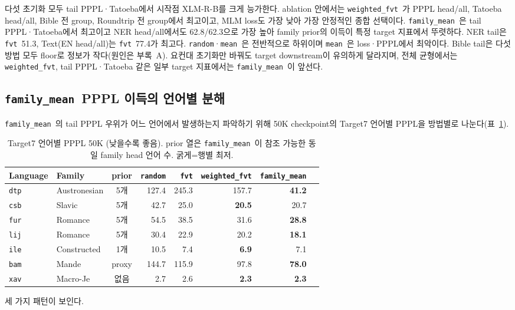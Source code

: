\documentclass[11pt,a4paper]{article}
\newcommand{\rand}{\texttt{random}}
\newcommand{\meanm}{\texttt{mean}}
\newcommand{\fvt}{\texttt{fvt}}
\newcommand{\wfvt}{\texttt{weighted\_fvt}}
\newcommand{\famm}{\texttt{family\_mean}}
\begin{document}
다섯 초기화 모두 tail PPPL·Tatoeba에서 시작점 XLM-R-B를 크게 능가한다. ablation 안에서는 \wfvt\ 가 PPPL head/all, Tatoeba head/all, Bible 전 group, Roundtrip 전 group에서 최고이고, MLM loss도 가장 낮아 가장 안정적인 종합 선택이다. \famm\ 은 tail PPPL·Tatoeba에서 최고이고 NER head/all에서도 62.8/62.3으로 가장 높아 family prior의 이득이 특정 target 지표에서 뚜렷하다. NER tail은 \fvt\ 51.3, Text(EN head/all)는 \fvt\ 77.4가 최고다. \rand·\meanm\ 은 전반적으로 하위이며 \meanm\ 은 loss·PPPL에서 최악이다. Bible tail은 다섯 방법 모두 floor로 정보가 작다(원인은 부록~A). 요컨대 초기화만 바꿔도 target downstream이 유의하게 달라지며, 전체 균형에서는 \wfvt, tail PPPL·Tatoeba 같은 일부 target 지표에서는 \famm\ 이 앞선다.

\subsection{\famm\ PPPL 이득의 언어별 분해}
\famm\ 의 tail PPPL 우위가 어느 언어에서 발생하는지 파악하기 위해 50K checkpoint의 Target7 언어별 PPPL을 방법별로 나눈다(표~\ref{tab:pppl_lang}).

\begin{table}[H]\centering\small
\caption{Target7 언어별 PPPL 50K (낮을수록 좋음). prior 열은 \famm\ 이 참조 가능한 동일 family head 언어 수. 굵게=행별 최저.}
\label{tab:pppl_lang}
\begin{tabular}{@{}llcrrrrr@{}}
\toprule
Language & Family & prior & \rand & \fvt & \wfvt & \famm \\
\midrule
\texttt{dtp} & Austronesian & 5개 & 127.4 & 245.3 & 157.7 & \textbf{41.2} \\
\texttt{csb} & Slavic       & 5개 &  42.7 &  25.0 & \textbf{20.5} & 20.7 \\
\texttt{fur} & Romance      & 5개 &  54.5 &  38.5 &  31.6 & \textbf{28.8} \\
\texttt{lij} & Romance      & 5개 &  30.4 &  22.9 &  20.2 & \textbf{18.1} \\
\texttt{ile} & Constructed  & 1개 &  10.5 &   7.4 & \textbf{6.9} &  7.1 \\
\texttt{bam} & Mande        & proxy &144.7 & 115.9 &  97.8 & \textbf{78.0} \\
\texttt{xav} & Macro-Je     & 없음 &   2.7 &   2.6 & \textbf{2.3} & \textbf{2.3} \\
\bottomrule
\end{tabular}
\end{table}

세 가지 패턴이 보인다.
\end{document}
